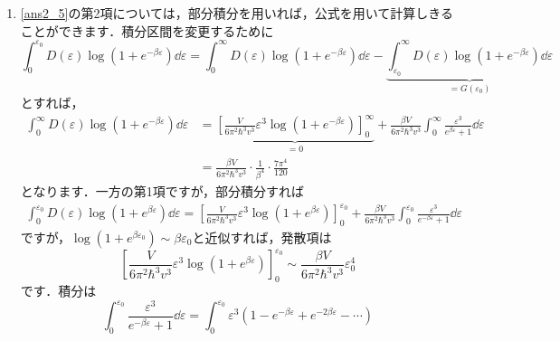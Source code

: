 \documentclass[a4paper,pdflatex,ja=standard]{bxjsarticle}
\begin{document}
\begin{enumerate}
  \item

  \eqref{ans2_5}の第2項については，部分積分を用いれば，公式を用いて計算しきることができます．積分区間を変更するために
  \begin{equation}    
    \int_0^{\varepsilon_0}
    D(\varepsilon)
    \log (1+e^{-\beta\varepsilon})
    \dd \varepsilon
    =
    \int_0^{\infty}
    D(\varepsilon)
    \log (1+e^{-\beta\varepsilon})
    \dd \varepsilon
    -
    \underbrace{
      \int_{\varepsilon_0}^{\infty}
      D(\varepsilon)
      \log (1+e^{-\beta\varepsilon})
      \dd \varepsilon
    }_{=G(\varepsilon_0)}
  \end{equation}
  とすれば，
  \begin{align}
    \int_0^{\infty}
    D(\varepsilon)
    \log (1+e^{-\beta\varepsilon})
    \dd \varepsilon
    &=
    \underbrace{
      \left[  
        \frac{V}{6\pi^2\hbar^3 v^3}\varepsilon^3
        \log (1+e^{-\beta\varepsilon})
      \right]_{0}^{\infty}
    }_{=0}
    +
    \frac{\beta V}{6\pi^2\hbar^3 v^3}
    \int_{0}^{\infty}
    \frac{\varepsilon^3}{e^{\beta\varepsilon}+1}
    \dd \varepsilon
    \nonumber
    \\
    &=
    \frac{\beta V}{6\pi^2\hbar^3 v^3}
    \cdot
    \frac{1}{\beta^4}\cdot\frac{7\pi^4}{120}
  \end{align}
  となります．一方の第1項ですが，部分積分すれば
  \begin{align}
    \int_{0}^{\varepsilon_0}
    D(\varepsilon)\log (1+e^{\beta\varepsilon})
    \dd \varepsilon
    =
    \left[  
      \frac{V}{6\pi^2\hbar^3 v^3}\varepsilon^3
      \log (1+e^{\beta\varepsilon})
    \right]_{0}^{\varepsilon_0}
    +
    \frac{\beta V}{6\pi^2\hbar^3 v^3}
    \int_{0}^{\varepsilon_0}
    \frac{\varepsilon^3}{e^{-\beta\varepsilon}+1}
    \dd \varepsilon
  \end{align}
  ですが，$\log(1+e^{\beta\varepsilon_0})\sim\beta\varepsilon_0$と近似すれば，発散項は
  \begin{equation}
    \left[  
      \frac{V}{6\pi^2\hbar^3 v^3}\varepsilon^3
      \log (1+e^{\beta\varepsilon})
    \right]_{0}^{\varepsilon_0}
    \sim
    \frac{\beta V}{6\pi^2\hbar^3 v^3}\varepsilon_0^4
  \end{equation}
  です．積分は
  \begin{equation}
    \int_0^{\varepsilon_0}
    \frac{\varepsilon^3}{e^{-\beta\varepsilon}+1}
    \dd \varepsilon
    =
    \int_0^{\varepsilon_0}
    \varepsilon^3
    \left(  
      1-e^{-\beta\varepsilon}+e^{-2\beta\varepsilon}-\cdots
    \right)

\end{equation}
\end{enumerate}
\end{document}
